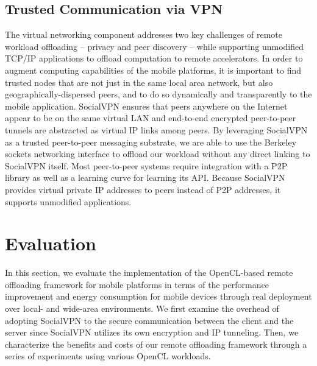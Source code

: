 \documentclass[10pt, conference, compsocconf]{IEEEtran}
\begin{document}
\subsection{Trusted Communication via VPN}
%
The virtual networking component addresses two key challenges of remote 
workload offloading -- privacy and peer discovery -- while supporting 
unmodified TCP/IP applications to offload computation to remote accelerators.
%
In order to augment computing capabilities of the mobile platforms, it is 
important to find trusted nodes that are not just in the same local area
network, but also geographically-dispersed peers, and to do so dynamically and 
transparently to the mobile application.
%
SocialVPN ensures that peers anywhere on the Internet appear to be on the
same virtual LAN and end-to-end encrypted peer-to-peer tunnels are abstracted
as virtual IP links among peers.
%
By leveraging SocialVPN as a trusted peer-to-peer messaging substrate, we
are able to use the Berkeley sockets networking interface to offload our
workload without any direct linking to SocialVPN itself.
%
Most peer-to-peer systems require integration with a P2P library as well as a 
learning curve for learning its API.
%
Because SocialVPN provides virtual private IP addresses to peers instead of
P2P addresses, it supports unmodified applications.
%
\section{Evaluation}
%
In this section, we evaluate the implementation of the OpenCL-based remote
offloading framework for mobile platforms in terms of the performance 
improvement and energy consumption for mobile devices through real deployment
over local- and wide-area environments.
%
We first examine the overhead of adopting SocialVPN to the secure 
communication between the client and the server since SocialVPN utilizes 
its own encryption and IP tunneling.
%
Then, we characterize the benefits and costs of our remote offloading 
framework through a series of experiments using various OpenCL 
workloads.
%
\end{document}

